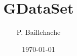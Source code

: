 \documentclass[12pt, a4paper]{article}
\begin{document}
\title{GDataSet}
\author{P. Baillehache}
\date{\today}
\maketitle

\tableofcontents


\end{document}
